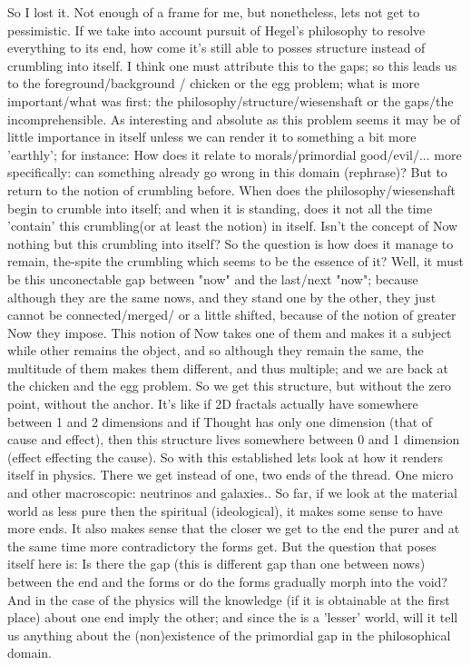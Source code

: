 \documentclass[10pt]{book}
\begin{document}
So I lost it. Not enough of a frame for me, but nonetheless, lets not get to pessimistic. If we take into account pursuit of Hegel's philosophy to resolve everything to its end, how come it's still able to posses structure instead of crumbling into itself. I think one must attribute this to the gaps; so this leads us to the foreground/background / chicken or the egg problem; what is more important/what was first: the philosophy/structure/wiesenshaft or the gaps/the incomprehensible.
As interesting and absolute as this problem seems it may be of little importance in itself unless we can render it to something a bit more 'earthly'; for instance: How does it relate to morals/primordial good/evil/... more specifically: can something already go wrong in this domain (rephrase)?
But to return to the notion of crumbling before. When does the philosophy/wiesenshaft begin to crumble into itself; and when it is standing, does it not all the time 'contain' this crumbling(or at least the notion) in itself. Isn't the concept of Now nothing but this crumbling into itself? So the question is how does it manage to remain, the-spite the crumbling which seems to be the essence of it? Well, it must be this unconectable gap between "now" and the last/next "now"; because although they are the same nows, and they stand one by the other, they just cannot be connected/merged/ or a little shifted, because of the notion of greater Now they impose. This notion of Now takes one of them and makes it a subject while other remains the object, and so although they remain the same, the multitude of them makes them different, and thus multiple; and we are back at the chicken and the egg problem. So we get this structure, but without the zero point, without the anchor. It's like if 2D fractals actually have somewhere between 1 and 2 dimensions and if Thought has only one dimension (that of cause and effect), then this structure lives somewhere between 0 and 1 dimension (effect effecting the cause). 
So with this established lets look at how it renders itself in physics. There we get instead of one, two ends of the thread. One micro and other macroscopic: neutrinos and galaxies.. So far, if we look at the material world as less pure then the spiritual (ideological), it makes some sense to have more ends. It also makes sense that the closer we get to the end the purer and at the same time more contradictory the forms get. But the question that poses itself here is: Is there the gap (this is different gap than one between nows) between the end and the forms or do the forms gradually morph into the void? And in the case of the physics will the knowledge (if it is obtainable at the first place) about one end imply the other; and since the is a 'lesser' world, will it tell us anything about the (non)existence of the primordial gap in the philosophical domain.
\end{document}
